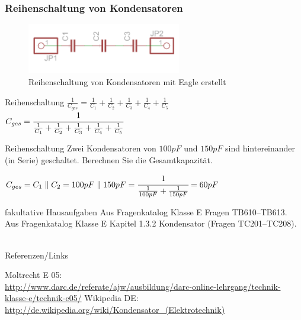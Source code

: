 \begin{frame}
  \frametitle{Reihenschaltung von Kondensatoren}
  \begin{center}
    \begin{figure}
      \includegraphics[width=0.6\textwidth,height=.5\textheight,keepaspectratio]{e05/c-reihe.png}
      \caption{Reihenschaltung von Kondensatoren {\tiny mit Eagle erstellt}}
    \end{figure}
  \end{center}
  \begin{block}{Reihenschaltung}
    $\frac{1}{C_{ges}} = \frac{1}{C_1} + \frac{1}{C_2} + \frac{1}{C_3} + \frac{1}{C_4} + \frac{1}{C_5}$\\
    $C_{ges} = \cfrac{1}{\frac{1}{C_1} + \frac{1}{C_2} + \frac{1}{C_3} + \frac{1}{C_4} + \frac{1}{C_5}}$
  \end{block}
\end{frame}

\begin{frame}
  \begin{exampleblock}{Reihenschaltung}
    Zwei Kondensatoren von $100 pF$ und $150 pF$ sind hintereinander (in Serie) geschaltet. Berechnen Sie die Gesamtkapazität.
  \end{exampleblock}
  \pause
  \begin{center}
    $C_{ges} = C_1 \parallel C_2 = 100 pF \parallel 150 pF = \cfrac{1}{\frac{1}{100 pF} + \frac{1}{150 pF}} = 60 pF$
  \end{center}
\end{frame}

\begin{frame}
  \begin{alertblock}{fakultative Hausaufgaben}
    Aus Fragenkatalog Klasse E Fragen TB610--TB613.\\
    Aus Fragenkatalog Klasse E Kapitel 1.3.2 Kondensator (Fragen TC201--TC208).
  \end{alertblock}
\end{frame}



\renewcommand{\refname}{Referenzen}

\hypertarget{refs}{}
\textcolor{white}{} \\ %
\Large Referenzen/Links
\footnotesize

\begin{thebibliography}{}
     Moltrecht E 05: \\
    \url{http://www.darc.de/referate/ajw/ausbildung/darc-online-lehrgang/technik-klasse-e/technik-e05/}
      Wikipedia DE: \\
    \url{http://de.wikipedia.org/wiki/Kondensator_(Elektrotechnik)}\\
\end{thebibliography}


